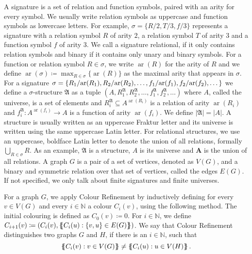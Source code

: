 A signature is a set of relation and function symbols, paired with an arity for every symbol.
We usually write relation symbols as uppercase and function symbols as lowercase letters.
For example, $\sigma=\{R/2, T/3, f/3\}$ represents a signature with a relation symbol $R$ of arity $2$, a relation symbol $T$ of arity $3$ and a function symbol $f$ of arity $3$.
We call a signature relational, if it only contains relation symbols and binary if it contains only unary and binary symbols.
For a function or relation symbol $R\in \sigma$, we write $\operatorname{ar}(R)$ for the arity of $R$ and we define $\operatorname{ar}(\sigma)\coloneqq \max_{R\in\sigma}\{\operatorname{ar}(R)\}$ as the maximal arity that appears in $\sigma$.
For a signature 
$\sigma=\{R_1/\kern-.15em\operatorname{ar}(R_1), R_2/\kern-.15em\operatorname{ar}(R_2), \dots, f_1/\kern-.15em\operatorname{ar}(f_1),f_2/\kern-.15em\operatorname{ar}(f_2),\dots\}$
 we define a $\sigma$-structure $\mathfrak A$ as a tuple $(A,R_1^{\mathfrak A},R_2^{\mathfrak A},\dots,f_1^{\mathfrak A},f_2^{\mathfrak A},\dots)$ where $A$, called the universe, is a set of elements and $R_i^{\mathfrak A}\subseteq A^{\operatorname{ar}(R_i)}$ is a relation of arity $\operatorname{ar}(R_i)$ and $f_i^{\mathfrak A}:A^{\operatorname{ar}(f_i)}\to A$ is a function of arity $\operatorname{ar}(f_i)$.
We define $\vert \mathfrak A\vert =\vert A \vert$.
A structure is usually written as an uppercase Fraktur letter and its universe is written using the same uppercase Latin letter.
For relational structures, we use an uppercase, boldface Latin letter to denote the union of all relations, formally $\bigcup_{R\in\sigma}R$.
As an example, $\mathfrak A$ is a structure, $A$ is its universe and $\mathbf A$ is the union of all relations.
A graph $G$ is a pair of a set of vertices, denoted as $V(G)$, and a binary and symmetric relation over that set of vertices, called the edges $E(G)$.
If not specified, we only talk about finite signatures and finite universes.

For a graph $G$, we apply Colour Refinement by inductively defining for every $v\in V(G)$ and every $i\in \mathbb N$ a colour $C_i(v)$, using the following method.
The initial colouring is defined as $C_0(v)\coloneqq0$.
For $i\in \mathbb N$, we define $C_{i+1}(v)\coloneqq(C_i(v), \left\{\kern-.35em\left\{C_i(u) : \{v,u\}\in E(G)\right\}\kern-.35em\right\})$.
We say that Colour Refinement distinguishes two graphs $G$ and $H$, if there is an $i\in \mathbb N$, such that 
$$\left\{\kern-.35em\left\{C_i(v) : v\in V(G)\right\}\kern-.35em\right\}\neq \left\{\kern-.35em\left\{C_i(u) : u \in V(H)\right\}\kern-.35em\right\}.$$

